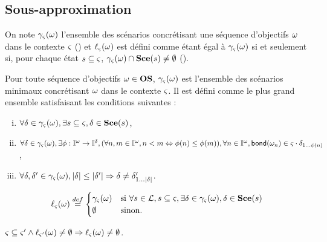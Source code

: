 \subsection{Sous-approximation}

On note $\gamma_\varsigma(\omega)$ l'ensemble des scénarios concrétisant
une séquence d'objectifs $\omega$ dans le contexte $\varsigma$ ()
et $\ell_\varsigma(\omega)$ est défini comme étant égal à $\gamma_\varsigma(\omega)$ si et seulement si,
pour chaque état $s \subseteq \varsigma$,
$\gamma_\varsigma(\omega) \cap \mathbf{Sce}(s) \neq \emptyset$ ().

\begin{definition}[$\concr : \OS \to \powerset(\Sce)$]
  Pour toute séquence d'objectifs $\omega \in \mathbf{OS}$, $\gamma_\varsigma(\omega)$ est l'ensemble des
  scénarios minimaux concrétisant $\omega$ dans le contexte $\varsigma$.
  Il est défini comme le plus grand ensemble satisfaisant les conditions suivantes :
  \begin{enumerate}[(i)]
  \item $\forall \delta \in \gamma_\varsigma(\omega), \exists s \subseteq \varsigma, \delta \in \mathbf{Sce}(s)$,
  \item $\forall \delta \in \gamma_\varsigma(\omega), \exists \phi : \mathbb{I}^{\omega} \to \mathbb{I}^{\delta},
      (\forall n, m \in \mathbb{I}^{\omega}, n < m \Leftrightarrow \phi(n) \leq \phi(m)),
      \forall n \in \mathbb{I}^{\omega}, \mathsf{bond}(\omega_n) \in \varsigma \cdot \delta_{1 \ldots \phi(n)}$,
  \item $\forall \delta, \delta' \in \gamma_\varsigma(\omega),
      |\delta| \leq |\delta'| \Rightarrow \delta \neq \delta'_{1 \ldots |\delta|}$.
  \end{enumerate}
\end{definition}

\begin{definition}[$\uconcr : \OS \to \powerset(\Sce)$]
  \[ \ell_\varsigma(\omega) \stackrel{def}=
    \begin{cases}
      \gamma_\varsigma(\omega) & \text{si } \forall s \in \mathcal{L}, s \subseteq \varsigma, \exists \delta \in \gamma_\varsigma(\omega),
        \delta \in \mathbf{Sce}(s) \\
      \emptyset & \text{sinon.}
    \end{cases} \]
\end{definition}

\begin{lemma}
  $\varsigma \subseteq \varsigma' \wedge \ell_{\varsigma'}(\omega) \neq \emptyset \Rightarrow
    \ell_{\varsigma}(\omega) \neq \emptyset$.
\end{lemma}

